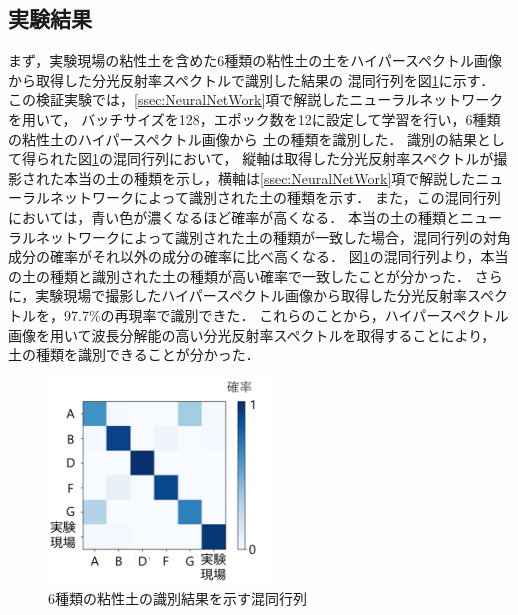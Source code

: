 \subsection{実験結果}
\label{ssec:ConeindexEstimationExperimentResult}

まず，実験現場の粘性土を含めた6種類の粘性土の土をハイパースペクトル画像から取得した分光反射率スペクトルで識別した結果の
混同行列を図\ref{fig:coneindex_estimation_confusion_matrix}に示す．
この検証実験では，\ref{ssec:NeuralNetWork}項で解説したニューラルネットワークを用いて，
バッチサイズを128，エポック数を12に設定して学習を行い，6種類の粘性土のハイパースペクトル画像から
土の種類を識別した．
識別の結果として得られた図\ref{fig:coneindex_estimation_confusion_matrix}の混同行列において，
縦軸は取得した分光反射率スペクトルが撮影された本当の土の種類を示し，横軸は\ref{ssec:NeuralNetWork}項で解説したニューラルネットワークによって識別された土の種類を示す．
また，この混同行列においては，青い色が濃くなるほど確率が高くなる．
本当の土の種類とニューラルネットワークによって識別された土の種類が一致した場合，混同行列の対角成分の確率がそれ以外の成分の確率に比べ高くなる．
図\ref{fig:coneindex_estimation_confusion_matrix}の混同行列より，本当の土の種類と識別された土の種類が高い確率で一致したことが分かった．
さらに，実験現場で撮影したハイパースペクトル画像から取得した分光反射率スペクトルを，97.7\%の再現率で識別できた．
これらのことから，ハイパースペクトル画像を用いて波長分解能の高い分光反射率スペクトルを取得することにより，
土の種類を識別できることが分かった．

\begin{figure}[b]
      \begin{center}
            \includegraphics[width=6cm]{./ch5_ConeIndexEstimation/Fig/coneindex_estimation_confusion_matrix_compressed.pdf}
            \caption{6種類の粘性土の識別結果を示す混同行列}
            \label{fig:coneindex_estimation_confusion_matrix}
      \end{center}
\end{figure}

